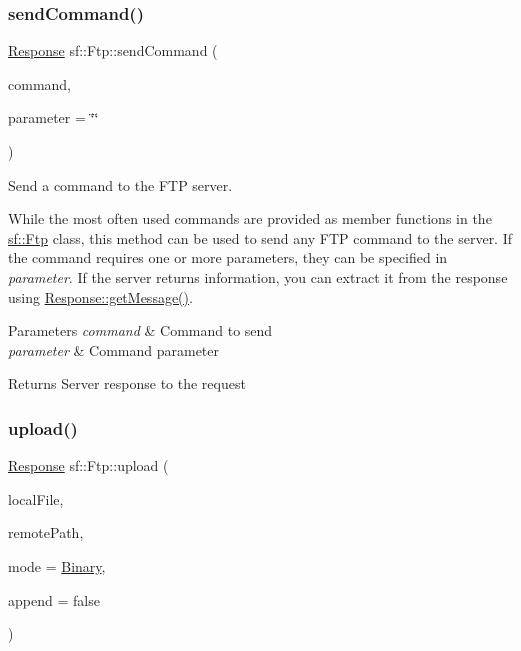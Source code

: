 \subsubsection{\texorpdfstring{sendCommand()}{sendCommand()}}
{\footnotesize\ttfamily \mbox{\hyperlink{classsf_1_1_ftp_1_1_response}{Response}} sf\+::\+Ftp\+::send\+Command (\begin{DoxyParamCaption}\item[{const std\+::string \&}]{command,  }\item[{const std\+::string \&}]{parameter = {\ttfamily \char`\"{}\char`\"{}} }\end{DoxyParamCaption})}



Send a command to the F\+TP server. 

While the most often used commands are provided as member functions in the \mbox{\hyperlink{classsf_1_1_ftp}{sf\+::\+Ftp}} class, this method can be used to send any F\+TP command to the server. If the command requires one or more parameters, they can be specified in {\itshape parameter}. If the server returns information, you can extract it from the response using \mbox{\hyperlink{classsf_1_1_ftp_1_1_response_a4af82a0b3620c90558390e1f600abc05}{Response\+::get\+Message()}}.


\begin{DoxyParams}{Parameters}
{\em command} & Command to send \\
\hline
{\em parameter} & Command parameter\\
\hline
\end{DoxyParams}
\begin{DoxyReturn}{Returns}
Server response to the request \begin{DoxyVerb}\end{DoxyVerb}
 
\end{DoxyReturn}
\mbox{\label{classsf_1_1_ftp_a0402d2cec27a197ffba34c88ffaddeac}} 
\subsubsection{\texorpdfstring{upload()}{upload()}}
{\footnotesize\ttfamily \mbox{\hyperlink{classsf_1_1_ftp_1_1_response}{Response}} sf\+::\+Ftp\+::upload (\begin{DoxyParamCaption}\item[{const std\+::string \&}]{local\+File,  }\item[{const std\+::string \&}]{remote\+Path,  }\item[{\mbox{\hyperlink{classsf_1_1_ftp_a1cd6b89ad23253f6d97e6d4ca4d558cb}{Transfer\+Mode}}}]{mode = {\ttfamily \mbox{\hyperlink{classsf_1_1_ftp_a1cd6b89ad23253f6d97e6d4ca4d558cba6f253b362639fb5e059dc292762a21ee}{Binary}}},  }\item[{bool}]{append = {\ttfamily false} }\end{DoxyParamCaption})}



